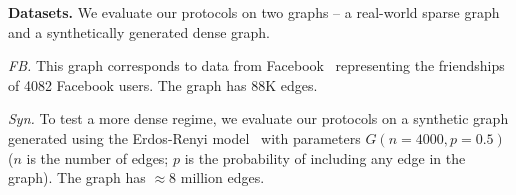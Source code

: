 \noindent\textbf{Datasets.} We evaluate our protocols on two graphs -- a real-world sparse graph and a synthetically generated dense graph.
\squishlist
    \item \textit{FB.} This graph  corresponds to data from Facebook~\cite{FB} representing the friendships of 4082 Facebook users. The graph has $88$K edges. %
    \item \textit{Syn.} To test a more dense regime, we evaluate our protocols on a synthetic graph generated using the Erdos-Renyi model~\cite{ER} with parameters $G(n=4000, p=0.5)$ ($n$ is the number of edges; $p$ is the probability of including any edge in the graph).  The graph has $\approx 8$ million edges. %
\squishend

